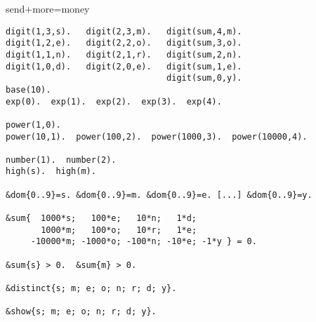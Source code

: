 \begin{frame}[fragile,shrink=1]{send+more=money}
\begin{lstlisting}
digit(1,3,s).   digit(2,3,m).   digit(sum,4,m).
digit(1,2,e).   digit(2,2,o).   digit(sum,3,o).
digit(1,1,n).   digit(2,1,r).   digit(sum,2,n).
digit(1,0,d).   digit(2,0,e).   digit(sum,1,e).
                                digit(sum,0,y).
base(10).
exp(0).  exp(1).  exp(2).  exp(3).  exp(4).

power(1,0).
power(10,1).  power(100,2).  power(1000,3).  power(10000,4).

number(1).  number(2).
high(s).  high(m).

&dom{0..9}=s. &dom{0..9}=m. &dom{0..9}=e. [...] &dom{0..9}=y.

&sum{  1000*s;   100*e;   10*n;   1*d;
       1000*m;   100*o;   10*r;   1*e;
     -10000*m; -1000*o; -100*n; -10*e; -1*y } = 0.

&sum{s} > 0.  &sum{m} > 0.

&distinct{s; m; e; o; n; r; d; y}.

&show{s; m; e; o; n; r; d; y}.
\end{lstlisting}
\end{frame}
%
